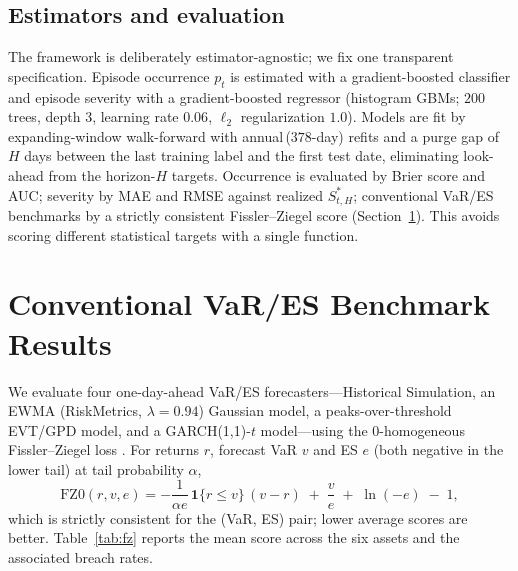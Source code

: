 \documentclass[11pt]{article}
\newcommand{\ind}{\mathbf{1}}
\begin{document}
\subsection{Estimators and evaluation}
The framework is deliberately estimator-agnostic; we fix one transparent specification. Episode occurrence
$p_t$ is estimated with a gradient-boosted classifier and episode severity with a gradient-boosted
regressor (histogram GBMs; $200$ trees, depth $3$, learning rate $0.06$, $\ell_2$ regularization $1.0$).
Models are fit by expanding-window walk-forward with annual\,($378$-day) refits and a purge gap of $H$ days
between the last training label and the first test date, eliminating look-ahead from the horizon-$H$
targets. Occurrence is evaluated by Brier score and AUC; severity by MAE and RMSE against realized
$S^{*}_{t,H}$; conventional VaR/ES benchmarks by a strictly consistent Fissler--Ziegel score
(Section~\ref{sec:bench}). This avoids scoring different statistical targets with a single function.

\section{Conventional VaR/ES Benchmark Results}\label{sec:bench}

We evaluate four one-day-ahead VaR/ES forecasters---Historical Simulation, an EWMA (RiskMetrics,
$\lambda=0.94$) Gaussian model, a peaks-over-threshold EVT/GPD model, and a GARCH(1,1)-$t$ model---using the
$0$-homogeneous Fissler--Ziegel loss \citep{fz2016,pzc2019}. For returns $r$, forecast VaR $v$ and ES $e$
(both negative in the lower tail) at tail probability $\alpha$,
\begin{equation}
\mathrm{FZ0}(r,v,e)= -\frac{1}{\alpha e}\,\ind\{r\le v\}\,(v-r)\;+\;\frac{v}{e}\;+\;\ln(-e)\;-\;1,
\label{eq:fz0}
\end{equation}
which is strictly consistent for the (VaR, ES) pair; lower average scores are better. Table~\ref{tab:fz}
reports the mean score across the six assets and the associated breach rates.
\end{document}
